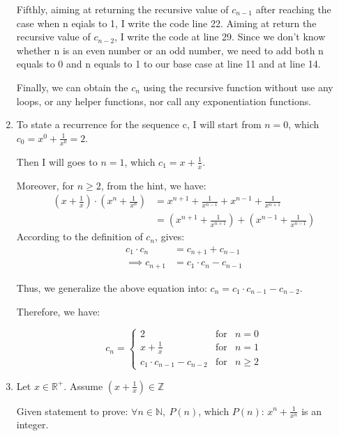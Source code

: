 \documentclass[12pt]{article}
\begin{document}
\begin{enumerate}[label=(\alph*)]
\noindent Fifthly, aiming at returning the recursive value of $c_{n-1}$ after reaching the case when n eqials to 1, I write the code line 22.
Aiming at return the recursive value of $c_{n-2}$, I write the code at line 29.
Since we don't know whether n is an even number or an odd number, we need to add both n equals to 0 and n equals to 1 to our base case at line 11 and at line 14.

\noindent Finally, we can obtain the $c_n$ using the recursive function without use any loops, or any helper functions, nor call any exponentiation functions.

    \item To state a recurrence for the sequence c, I will start from $n=0$, which $c_0 = x^0 + \frac{1}{x^0} = 2$.
    
    Then I will goes to $n=1$, which $c_1 = x + \frac{1}{x}$.

    Moreover, for $ n\geq 2$, from the hint, we have:
    \begin{align*}
        (x + \frac{1}{x}) \cdot (x^n + \frac{1}{x^n}) &= x^{n+1} + \frac{1}{x^{n-1}} + x^{n-1} + \frac{1}{x^{n+1}} \\
        &= (x^{n+1} + \frac{1}{x^{n+1}}) + (x^{n-1} + \frac{1}{x^{n-1}})
    \end{align*}
    \noindent According to the definition of $c_n$, gives:
    \begin{align*}
        c_1 \cdot c_n &= c_{n+1} + c_{n-1} \\
        \implies c_{n+1} &= c_1 \cdot c_n - c_{n-1}
    \end{align*}

    Thus, we generalize the above equation into: $c_{n} = c_1 \cdot c_{n-1} - c_{n-2}$.

    Therefore, we have:

    $$c_n =  \left\{ \begin{array}{lcl}
        2 & \mbox{for} & n = 0 \\
        x + \frac{1}{x} & \mbox{for} & n=1 \\
        c_1 \cdot c_{n-1} - c_{n-2} & \mbox{for} & n\geq2
    \end{array}\right. $$

    \item Let $x\in \mathbb{R}^{+}$. Assume $(x + \frac{1}{x}) \in \mathbb{Z}$

    Given statement to prove: $\forall n \in \mathbb{N},\ P(n)$, which $P(n)$: $x^n + \frac{1}{x^n}$ is an integer.


\end{enumerate}
\end{document}
